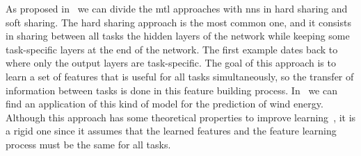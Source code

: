 As proposed in~\cite{Ruder17a} we can divide the \acrshort{mtl} approaches with \acrshort{nns} in hard sharing and soft sharing.
The hard sharing approach is the most common one, and it consists in sharing between all tasks the hidden layers of the network while keeping some task-specific layers at the end of the network. The first example dates back to~\cite{Caruana97} where only the output layers are task-specific. The goal of this approach is to learn a set of features that is useful for all tasks simultaneously, so the transfer of information between tasks is done in this feature building process. In~\citet{Dorado-MorenoNG20} we can find an application of this kind of model for the prediction of wind energy. Although this approach has some theoretical properties to improve learning~\citep{baxter2000model}, it is a rigid one since it assumes that the learned features and the feature learning process must be the same for all tasks.

